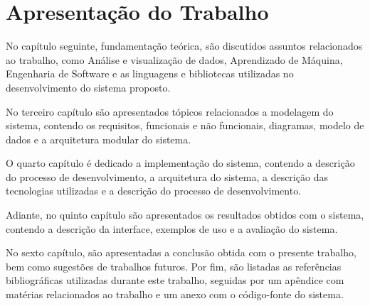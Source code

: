 

\section{Apresentação do Trabalho}
    \label{sec:apresentacao-trabalho}

    No capítulo seguinte, fundamentação teórica, são discutidos assuntos relacionados ao trabalho, como Análise e visualização de dados, Aprendizado de Máquina, Engenharia de Software e as linguagens e bibliotecas utilizadas no desenvolvimento do sistema proposto.

    No terceiro capítulo são apresentados tópicos relacionados a modelagem do sistema, contendo os requisitos, funcionais e não funcionais, diagramas, modelo de dados e a arquitetura modular do sistema.

    O quarto capítulo é dedicado a implementação do sistema, contendo a descrição do processo de desenvolvimento, a arquitetura do sistema, a descrição das tecnologias utilizadas e a descrição do processo de desenvolvimento.

    Adiante, no quinto capítulo são apresentados os resultados obtidos com o sistema, contendo a descrição da interface, exemplos de uso e a avaliação do sistema.

    No sexto capítulo, são apresentadas a conclusão obtida com o presente trabalho, bem como sugestões de trabalhos futuros. Por fim, são listadas as referências bibliográficas utilizadas durante este trabalho, seguidas por um apêndice com matérias relacionados ao trabalho e um anexo com o código-fonte do sistema.
